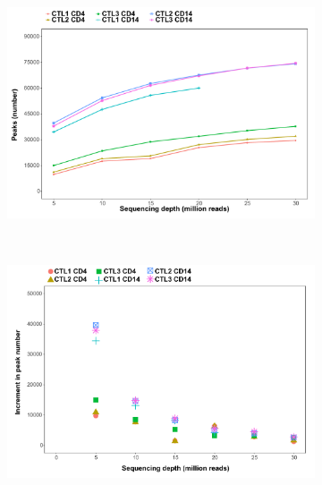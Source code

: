 \begin{figure}[htbp]
\centering
\begin{subfigure}{0.50\textwidth}
\centering
\includegraphics[width=\textwidth]{./Results1/pdfs/ATAC_Core_fresh_CD4_CD14_num_peaks_vs_depth}
\caption{\textbf{}}
\end{subfigure} \\
\begin{subfigure}{0.45\textwidth}
\centering
\includegraphics[width=\textwidth]{./Results1/pdfs/ATAC_Core_fresh_CD4_CD14_increment_num_peaks_vs_depth}
\caption{\textbf{}}
\end{subfigure} %
\begin{subfigure}{0.45\textwidth}
\centering

\end{subfigure}
\end{figure}
